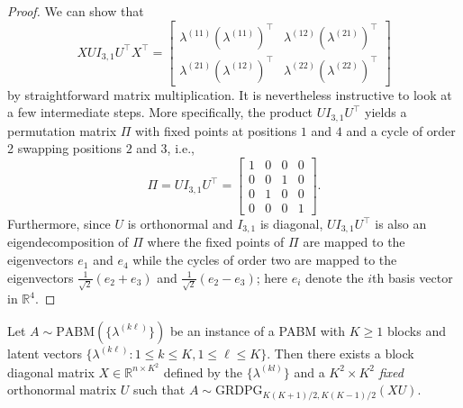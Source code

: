 \documentclass[12pt]{article}
\begin{document}
\begin{proof}
  We can show that
\[X U I_{3, 1} U^\top X^\top =
\begin{bmatrix}
  \lambda^{(11)} (\lambda^{(11)})^\top & \lambda^{(12)} (\lambda^{(21)})^\top \\
  \lambda^{(21)} (\lambda^{(12)})^\top & \lambda^{(22)} (\lambda^{(22)})^\top
\end{bmatrix} \]
by straightforward matrix multiplication. It is nevertheless
instructive to look at a few intermediate steps. More specifically,
the product $U I_{3, 1} U^\top$ yields a permutation matrix $\Pi$
with fixed points at positions $1$ and $4$ and a cycle of order 2 swapping
positions $2$ and $3$, i.e., 
$$\Pi = U I_{3, 1} U^\top = \begin{bmatrix} 1 & 0 & 0 & 0 \\
  0 & 0 & 1 & 0 \\
  0 & 1 & 0 & 0 \\
  0 & 0 & 0 & 1
\end{bmatrix}.$$
Furthermore, since $U$ is orthonormal and $I_{3, 1}$ is diagonal, $U I_{3, 1} U^\top$
is also an eigendecomposition of $\Pi$ where the fixed
points of $\Pi$ are mapped to the eigenvectors $e_1$ and $e_4$
while the cycles of order two are mapped to the eigenvectors  
$\tfrac{1}{\sqrt{2}}(e_{2} + e_3)$ and $\tfrac{1}{\sqrt{2}}(e_{2} -
e_3)$; here $e_i$ denote the $i$th basis vector in $\mathbb{R}^{4}$. %
\end{proof}
\begin{theorem}[Generalization to $K > 2$]
\label{theorem2}
Let $A \sim \mathrm{PABM}(\{\lambda^{(k \ell)}\})$ be an instance of a
PABM with $K \geq 1$ blocks and latent vectors $\{\lambda^{(k \ell)}
\colon 1 \leq k \leq K, 1 \leq \ell \leq K\}$. Then there exists a block diagonal matrix
$X \in \mathbb{R}^{n \times K^2}$ defined by the $\{\lambda^{(kl)}\}$ and a $K^2 \times
K^2$ {\em fixed} orthonormal matrix $U$ such 
that $A \sim \mathrm{GRDPG}_{K (K+1) / 2, K (K-1) / 2}(XU)$.
\end{theorem}
\end{document}
